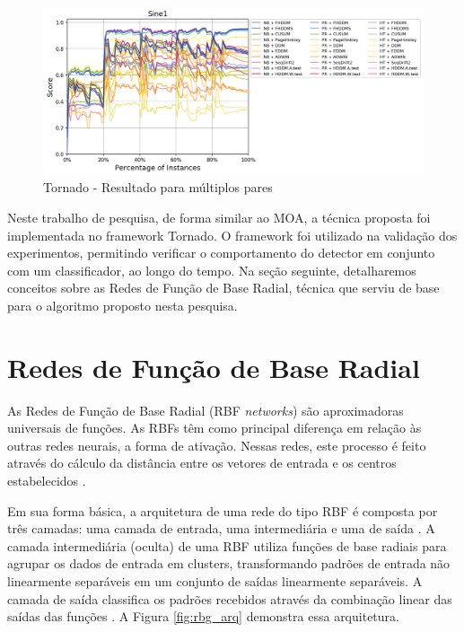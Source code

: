 \documentclass[qual, classic, a4paper]{ufbathesis}
\begin{document}
\begin{figure}[H]
\begin{center}
    \includegraphics[scale=0.5]{imagens/tornado_out2.png}
    \caption{Tornado - Resultado para múltiplos pares \cite{Pesaranghader:Tornado}}
    \label{fig:tornado_out2}
\end{center}
\end{figure}

Neste trabalho de pesquisa, de forma similar ao MOA, a técnica proposta foi implementada no framework Tornado.
O framework foi utilizado na validação dos experimentos, permitindo verificar o comportamento do detector em conjunto com um classificador, ao longo do tempo.
Na seção seguinte, detalharemos conceitos sobre as Redes de Função de Base Radial, técnica que serviu de base para o algoritmo proposto nesta pesquisa.

\section{Redes de Função de Base Radial}

As Redes de Função de Base Radial (RBF \textit{networks}) são aproximadoras universais de funções.
As RBFs têm como principal diferença em relação às outras redes neurais, a forma de ativação.
Nessas redes, este processo é feito através do cálculo da distância entre os vetores de entrada e os centros estabelecidos \cite{Braga:RedesNeuraisTeoriaAplicacoes}.

Em sua forma básica, a arquitetura de uma rede do tipo RBF é composta por três camadas: 
uma camada de entrada, uma intermediária e uma de saída \cite{Rojas:1996:NNS:235222}. 
A camada intermediária (oculta) de uma RBF utiliza funções de base radiais para agrupar os dados de entrada em clusters, 
transformando padrões de entrada não linearmente separáveis em um conjunto de saídas linearmente separáveis. 
A camada de saída classifica os padrões recebidos através da combinação linear das saídas das funções \cite{Braga:RedesNeuraisTeoriaAplicacoes}.
A Figura \ref{fig:rbg_arq} demonstra essa arquitetura.
\end{document}
